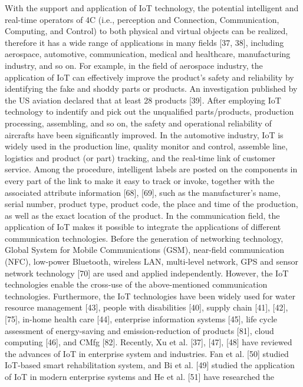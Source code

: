 With the support and application of IoT technology, the
potential intelligent and real-time operators of 4C (i.e., perception
and Connection, Communication, Computing, and Control)
to both physical and virtual objects can be realized, therefore it
has a wide range of applications in many fields [37, 38],
including aerospace, automotive, communication, medical and
healthcare, manufacturing industry, and so on.
For example, in the field of aerospace industry, the application
of IoT can effectively improve the product’s safety and reliability
by identifying the fake and shoddy parts or products. An
investigation published by the US aviation declared that at least
28%
products [39]. After employing IoT technology to indentify and
pick out the unqualified parts/products, production processing,
assembling, and so on, the safety and operational reliability of
aircrafts have been significantly improved.
In the automotive industry, IoT is widely used in the production
line, quality monitor and control, assemble line, logistics and
product (or part) tracking, and the real-time link of customer
service. Among the procedure, intelligent labels are posted on the
components in every part of the link to make it easy to track or
invoke, together with the associated attribute information [68],
[69], such as the manufacturer’s name, serial number, product
type, product code, the place and time of the production, as well
as the exact location of the product.
In the communication field, the application of IoT makes it
possible to integrate the applications of different communication
technologies. Before the generation of networking technology,
Global System for Mobile Communications (GSM), near-field
communication (NFC), low-power Bluetooth, wireless LAN,
multi-level network, GPS and sensor network technology [70]
are used and applied independently. However, the IoT technologies
enable the cross-use of the above-mentioned communication
technologies.
Furthermore, the IoT technologies have been widely used for
water resource management [43], people with disabilities [40],
supply chain [41], [42], [75], in-home health care [44], enterprise
information systems [45], life cycle assessment of energy-saving
and emission-reduction of products [81], cloud computing
[46], and CMfg [82]. Recently, Xu et al. [37], [47], [48]
have reviewed the advances of IoT in enterprise system and
industries. Fan et al. [50] studied IoT-based smart rehabilitation
system, and Bi et al. [49] studied the application of IoT in modern
enterprise systems and He et al. [51] have researched the
